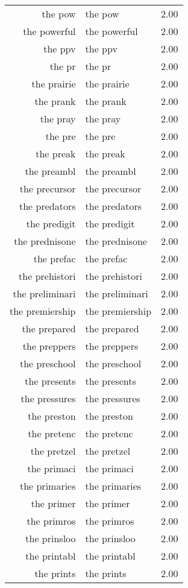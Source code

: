 \begin{table}[ht]
\begin{tabular}{rlr}
  the pow & the pow & 2.00 \\ 
  the powerful & the powerful & 2.00 \\ 
  the ppv & the ppv & 2.00 \\ 
  the pr & the pr & 2.00 \\ 
  the prairie & the prairie & 2.00 \\ 
  the prank & the prank & 2.00 \\ 
  the pray & the pray & 2.00 \\ 
  the pre & the pre & 2.00 \\ 
  the preak & the preak & 2.00 \\ 
  the preambl & the preambl & 2.00 \\ 
  the precursor & the precursor & 2.00 \\ 
  the predators & the predators & 2.00 \\ 
  the predigit & the predigit & 2.00 \\ 
  the prednisone & the prednisone & 2.00 \\ 
  the prefac & the prefac & 2.00 \\ 
  the prehistori & the prehistori & 2.00 \\ 
  the preliminari & the preliminari & 2.00 \\ 
  the premiership & the premiership & 2.00 \\ 
  the prepared & the prepared & 2.00 \\ 
  the preppers & the preppers & 2.00 \\ 
  the preschool & the preschool & 2.00 \\ 
  the presents & the presents & 2.00 \\ 
  the pressures & the pressures & 2.00 \\ 
  the preston & the preston & 2.00 \\ 
  the pretenc & the pretenc & 2.00 \\ 
  the pretzel & the pretzel & 2.00 \\ 
  the primaci & the primaci & 2.00 \\ 
  the primaries & the primaries & 2.00 \\ 
  the primer & the primer & 2.00 \\ 
  the primros & the primros & 2.00 \\ 
  the prinsloo & the prinsloo & 2.00 \\ 
  the printabl & the printabl & 2.00 \\ 
  the prints & the prints & 2.00 \\ 

\end{tabular}
\end{table}
